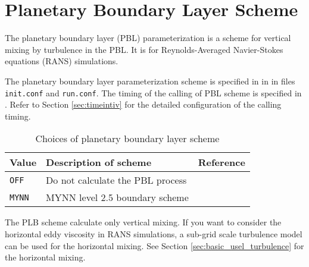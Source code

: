 
\section{Planetary Boundary Layer Scheme} \label{sec:basic_usel_pbl}

The planetary boundary layer (PBL) parameterization is a scheme for vertical mixing by turbulence in the PBL.
It is for Reynolds-Averaged Navier-Stokes equations (RANS) simulations.

The planetary boundary layer parameterization scheme is specified in  in  in files \verb|init.conf| and \verb|run.conf|. The timing of the calling of PBL scheme is specified in . Refer to Section \ref{sec:timeintiv} for the detailed configuration of the calling timing.

\begin{table}[h]
\begin{center}
  \caption{Choices of planetary boundary layer scheme}
  \label{tab:nml_atm_bl}
  \begin{tabularx}{150mm}{lXX} \hline
    \rowcolor[gray]{0.9}  Value & Description of scheme & Reference\\ \hline
      \verb|OFF|          & Do not calculate the PBL process &  \\
      \verb|MYNN|         & MYNN level 2.5 boundary scheme & \citet{my_1982,nakanishi_2004} \\
    \hline
  \end{tabularx}
\end{center}
\end{table}

The PLB scheme calculate only vertical mixing.
If you want to consider the horizontal eddy viscosity in RANS simulations,
a sub-grid scale turbulence model can be used for the horizontal mixing.
See Section \ref{sec:basic_usel_turbulence} for the horizontal mixing.
